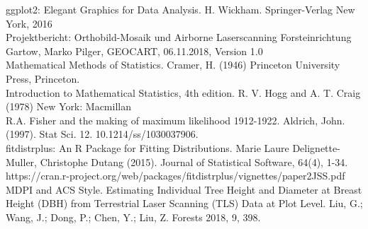 \noindent
[11] ggplot2: Elegant Graphics for Data Analysis. H. Wickham. Springer-Verlag New York, 2016 \\

\noindent
[12] Projektbericht: Orthobild-Mosaik und Airborne Laserscanning Forsteinrichtung Gartow, Marko Pilger, GEOCART, 06.11.2018, Version 1.0\\

\noindent
[13] Mathematical Methods of Statistics. Cramer, H. (1946) Princeton University Press, Princeton.\\

\noindent
[14]  Introduction to Mathematical Statistics, 4th edition. R. V. Hogg and A. T. Craig (1978) New York: Macmillan\\

\noindent
[15]  R.A. Fisher and the making of maximum likelihood 1912-1922. Aldrich, John. (1997). Stat Sci. 12. 10.1214/ss/1030037906. \\

\noindent
[16] fitdistrplus: An R Package for Fitting Distributions. Marie Laure Delignette-Muller, Christophe Dutang (2015).  Journal of Statistical Software, 64(4), 1-34.\\
 https://cran.r-project.org/web/packages/fitdistrplus/vignettes/paper2JSS.pdf\\

\noindent
[17] MDPI and ACS Style. Estimating Individual Tree Height and Diameter at Breast Height (DBH) from Terrestrial Laser Scanning (TLS) Data at Plot Level.
Liu, G.; Wang, J.; Dong, P.; Chen, Y.; Liu, Z. Forests 2018, 9, 398.\\




